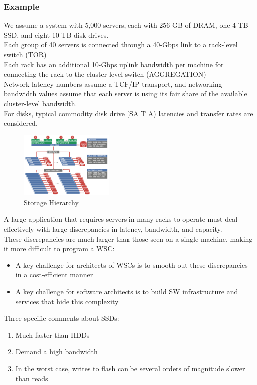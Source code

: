 \documentclass[10pt, oneside]{article}
\begin{document}
\subsubsection*{Example}
\begin{multicols}{2}
We assume a system with 5,000 servers, each with 256 GB of DRAM, one 4 TB SSD, and eight 10 TB disk drives.\\
Each group of 40 servers is connected through a 40-Gbps link to a rack-level switch (TOR)\\
Each rack has an additional 10-Gbps uplink bandwidth per machine for connecting the rack to the cluster-level switch (AGGREGATION)\\
Network latency numbers assume a TCP/IP transport, and networking bandwidth values assume that each server is using its fair share of the available cluster-level bandwidth.\\
For disks, typical commodity disk drive (SA T A) latencies and transfer rates are considered.
\columnbreak
\begin{figure}[H]
    \begin{center}
    \includegraphics[width=0.4\textwidth]{img/img25.png}
    \caption{Storage Hierarchy}
    \label{fig:Storage Hierarchy}
    \end{center}
\end{figure}
\end{multicols}
A large application that requires servers in many racks to operate must deal effectively with large discrepancies in latency, bandwidth, and capacity.\\
\newline
These discrepancies are much larger than those seen on a single machine, making it more difficult to program a WSC:
\begin{itemize}
    \item A key challenge for architects of WSCs is to smooth out these discrepancies in a cost-efficient manner
    \item A key challenge for software architects is to build SW infrastructure and services that hide this complexity
\end{itemize} Three specific comments about SSDs:
\begin{enumerate}
    \item Much faster than HDDs
    \item Demand a high bandwidth
    \item In the worst case, writes to flash can be several orders of magnitude slower than reads
\end{enumerate}
\end{document}
